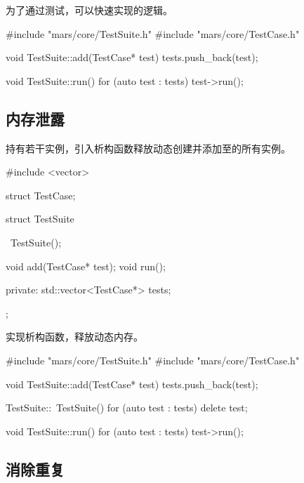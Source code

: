 \begin{content}
为了通过测试，可以快速实现的逻辑。

\begin{leftbar}
 \begin{c++}[caption={\ttfamily{src/mars/core/TestSuite.cc}}]
#include "mars/core/TestSuite.h"
#include "mars/core/TestCase.h"

void TestSuite::add(TestCase* test) {
  tests.push_back(test);
}

void TestSuite::run() {
  for (auto test : tests) {
    test->run();
  }
}
 \end{c++}
\end{leftbar}

\subsection{内存泄露}

持有若干实例，引入析构函数释放动态创建并添加至的所有实例。

\begin{leftbar}
 \begin{c++}[caption={\ttfamily{include/mars/core/TestSuite.h}}]
#include <vector>

struct TestCase;

struct TestSuite {
  ~TestSuite();

  void add(TestCase* test);
  void run();

private:
  std::vector<TestCase*> tests;
};
 \end{c++}
\end{leftbar}

实现析构函数，释放动态内存。

\begin{leftbar}
 \begin{c++}[caption={\ttfamily{src/mars/core/TestSuite.cc}}]
#include "mars/core/TestSuite.h"
#include "mars/core/TestCase.h"

void TestSuite::add(TestCase* test) {
  tests.push_back(test);
}

TestSuite::~TestSuite() {
  for (auto test : tests) {
    delete test;
  }
}

void TestSuite::run() {
  for (auto test : tests) {
    test->run();
  }
}
 \end{c++}
\end{leftbar}

\subsection{消除重复}


\end{content}
